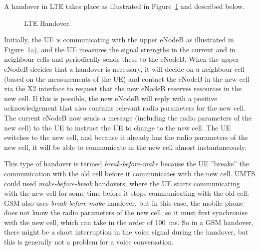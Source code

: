 A handover in LTE takes place as illustrated in Figure~\ref{fig:LTE-HO} and described below.
\begin{figure}[htbp]
\centering
\begin{subfigure}[t]{\textwidth}
\centering{}
\caption{}
\end{subfigure}
\begin{subfigure}[t]{\textwidth}
\centering{}
\caption{}
\end{subfigure}
\begin{subfigure}[t]{\textwidth}
\centering{}
\caption{}
\end{subfigure}
\caption{\label{fig:LTE-HO}LTE Handover.}
\end{figure}

Initially, the UE is communicating with the upper eNodeB as illustrated in Figure~\ref{fig:LTE-HO}a), and the UE measures the signal strengths in the current and in neighbour cells and periodically sends these to the eNodeB. When the upper eNodeB decides that a handover is necessary, it will decide on a neighbour cell (based on the measurements of the UE) and contact the eNodeB in the new cell via the X2 interface to request that the new eNodeB reserves resources in the new cell. If this is possible, the new eNodeB will reply with a positive acknowledgement that also contains relevant radio parameters for the new cell. The current eNodeB now sends a message (including the radio parameters of the new cell) to the UE to instruct the UE to change to the new cell. The UE  switches to the new cell, and because it already has the radio parameters of the new cell, it will be able to communicate in the new cell almost instantaneously.

This type of handover is termed \emph{break-before-make} because the UE ''breaks'' the communication with the old cell before it communicates with the new cell. UMTS could used \emph{make-before-break} handovers, where the UE starts communicating with the new cell for some time before it stops communicating with the old cell. GSM also uses \emph{break-before-make} handover, but in this case, the mobile phone does not know the radio parameters of the new cell, so it must first synchronise with the new cell, which can take in the order of 100~ms. So in a GSM handover, there might be a short interruption in the voice signal during the handover, but this is generally not a problem for a voice conversation.

